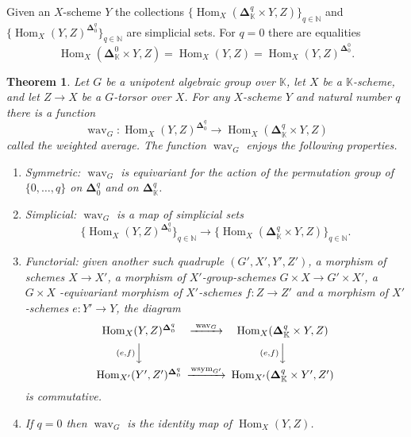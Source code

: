 \documentclass[10pt]{amsart}
\newtheorem{thm}[equation]{Theorem}
\theoremstyle{definition}
\numberwithin{equation}{section}
\newcommand{\opn}{\operatorname}
\newcommand{\mbb}[1]{\mathbb{#1}}
\newcommand{\bsym}[1]{\boldsymbol{#1}}
\newcommand{\K}{\mbb{K}}
\begin{document}
Given an $X$-scheme $Y$ the collections
$\bigl\{ \opn{Hom}_{X}(\bsym{\Delta}^q_{\K} 
\times Y, Z) \bigr\}_{q \in \mbb{N}}$ and \linebreak
$\bigl\{ \opn{Hom}_{X}(Y, Z)
^{\bsym{\Delta}^q_0} \bigr\}_{q \in \mbb{N}}$
are simplicial sets. For $q = 0$ there are equalities
\begin{equation} \label{eqn6.2}
\opn{Hom}_{X}(\bsym{\Delta}^0_{\K} \times Y, Z) = 
\opn{Hom}_{X}(Y, Z) 
= \opn{Hom}_{X}(Y, Z)^{\bsym{\Delta}^0_0} . 
\end{equation}

\begin{thm} \label{thm5.1}
Let $G$ be a unipotent algebraic group over 
$\K$, let $X$ be a $\K$-scheme, and let $Z \to X$ be a $G$-torsor 
over $X$. For any $X$-scheme $Y$ and natural number $q$ 
there is a function
\[ \opn{wav}_G : \opn{Hom}_X(Y, Z)^{\bsym{\Delta}^q_{0}} \to
\opn{Hom}_X(\bsym{\Delta}^q_{\K} \times Y, Z) \]
called the {\em weighted average}. The function $\opn{wav}_G$ 
enjoys the following properties.
\begin{enumerate}
\item Symmetric: $\opn{wav}_G$ is equivariant for the  
action of the permutation group of $\{ 0, \ldots, q \}$ on 
$\bsym{\Delta}^q_{0}$ and on $\bsym{\Delta}^q_{\K}$.
%
\item Simplicial: $\opn{wav}_G$ is a map of simplicial sets 
\[ \bigl\{ \opn{Hom}_{X}(Y, Z)
^{\bsym{\Delta}^q_0} \bigr\}_{q \in \mbb{N}}  \to
\bigl\{ \opn{Hom}_{X}(\bsym{\Delta}^q_{\K} 
\times Y, Z) \bigr\}_{q \in \mbb{N}} . \]
%
\item Functorial: given another such 
quadruple $(G', X', Y', Z')$, a morphism 
of schemes $X \to X'$, a morphism of $X'$-group-schemes 
$G \times X \to G' \times X'$,
a $G \times X$ -equivariant morphism of 
$X'$-schemes $f : Z \to Z'$ and a morphism of $X'$-schemes
$e : Y' \to Y$, the diagram
\[ \begin{CD}
\opn{Hom}_X(Y, Z)^{\bsym{\Delta}^q_{0}}
@>{\opn{wav}_G}>>
\opn{Hom}_X(\bsym{\Delta}^q_{\K} \times Y, Z) \\
@V{(e, f)}VV @V{(e, f)}VV \\
\opn{Hom}_{X'}(Y', Z')^{\bsym{\Delta}^q_{0}}
@>{\opn{wsym}_{G'}}>>
\opn{Hom}_{X'}(\bsym{\Delta}^q_{\K} \times Y', Z')
\end{CD} \]
is commutative.
%
\item If $q = 0$ then $\opn{wav}_G$ is the identity map of 
$\opn{Hom}_X(Y, Z)$.
\end{enumerate}
\end{thm}
\end{document}
